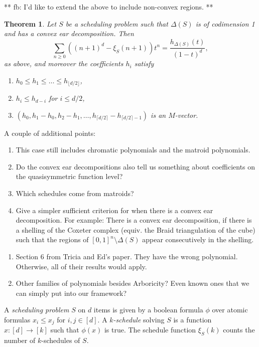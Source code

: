 \documentclass[12pt]{amsart}
\newtheorem{theorem}[definition]{Theorem}
\newcommand{\defn}[1]{\emph{#1}}
\newcommand{\floor}[1]{\lfloor {#1} \rfloor}
\newcommand{\ceil}[1]{\lceil {#1} \rceil}
\begin{document}
** fb: I'd like to extend the above to include non-convex regions. **

\begin{theorem}
Let $S$ be a scheduling problem such that $\Delta(S)$ is of codimension 1 and has a convex ear decomposition. Then 
\[
  \sum_{n \geq 0} ((n+1)^d - \xi_S(n+1)) t^n = \frac{h_{\Delta(S)}(t)}{(1-t)^d},
\]
as above, and moreover the coefficients $h_i$ satisfy
\begin{enumerate}
\item $h_0 \leq h_1 \leq \ldots \leq h_{\floor{d/2}}$,
\item $h_i\leq h_{d-i}$ for $i\leq d/2$,
\item $(h_0,h_1-h_0,h_2-h_1,\ldots,h_{\ceil{d/2}}-h_{\ceil{d/2}-1})$ is an $M$-vector.
\end{enumerate}
\end{theorem}

A couple of additional points:
\begin{enumerate} 
\item This case still includes chromatic polynomials and the matroid polynomials.
\item Do the convex ear decompositions also tell us something about coefficients on the quasisymmetric function level?
\item Which schedules come from matroids? 
\item Give a simpler sufficient criterion for when there is a convex ear decomposition. For example: There is a convex ear decomposition, if there is a shelling of the Coxeter complex (equiv. the Braid triangulation of the cube) such that the regions of $[0,1]^n\setminus\Delta(S)$ appear consecutively in the shelling.
\end{enumerate}


\begin{enumerate}
\item Section 6 from Tricia and Ed's paper.  They have the wrong polynomial.  Otherwise, all of their results would apply.
\item Other families of polynomials besides Arboricity?  Even known ones that we can simply put into our framework?
\end{enumerate}


A \defn{scheduling problem} $S$ on $d$ items is given by a boolean
formula $\phi$ over atomic formulas $x_i\leq x_j$ for $i,j\in[d]$. A
\defn{$k$-schedule} solving $S$ is a function $x:[d]\rightarrow[k]$
such that $\phi(x)$ is true. The schedule function $\xi_S(k)$ counts
the number of $k$-schedules of $S$.
\end{document}
